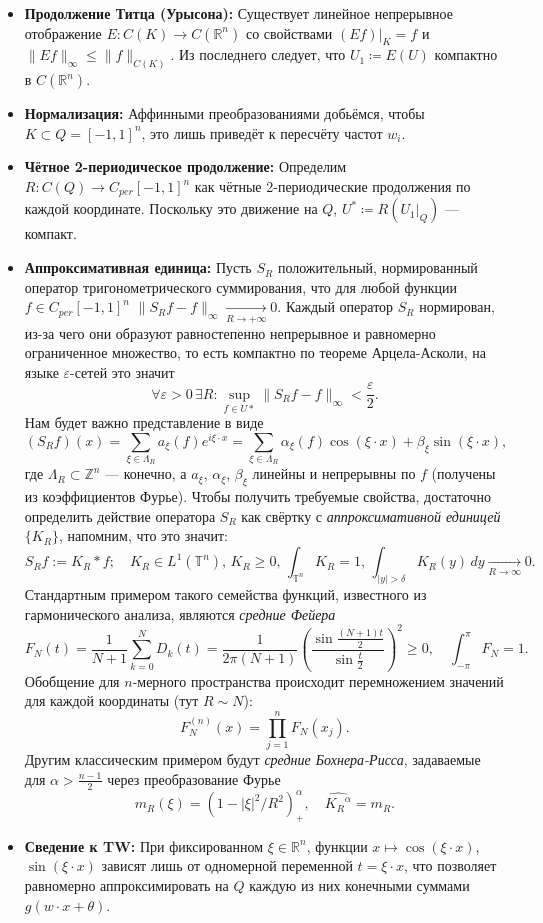 \documentclass[a4paper, 12pt]{article}
\theoremstyle{definition}
\theoremstyle{plain}
\theoremstyle{remark}
\theoremstyle{remark}
\theoremstyle{remark}
\begin{document}
\begin{itemize}
  \item \textbf{Продолжение Титца (Урысона):} Существует линейное непрерывное отображение $E\colon C(K) \to C(\mathbb{R}^n)$ со свойствами $(Ef)\big|_K = f$ и $\|Ef\|_\infty \le \|f\|_{C(K)}$.
  Из последнего следует, что $U_1 \coloneq E(U)$ компактно в $C(\mathbb{R}^n)$.
  \item \textbf{Нормализация:} Аффинными преобразованиями добьёмся, чтобы $K \subset Q = [-1, 1]^n$, это лишь приведёт к пересчёту частот $w_i$.
  \item \textbf{Чётное 2-периодическое продолжение:} Определим $R\colon C(Q) \to C_{per}[-1, 1]^n$ как чётные 2-периодические продолжения по каждой координате.
  Поскольку это движение на $Q$, $U^* \coloneq R(U_1\big|_Q)$ --- компакт.
  \item \textbf{Аппроксимативная единица:} Пусть $S_R$ положительный, нормированный оператор тригонометрического суммирования, что для любой функции $f \in C_{per}[-1, 1]^n$ $\|S_Rf - f\|_\infty \xrightarrow[R \to +\infty]{} 0$.
  Каждый оператор $S_R$ нормирован, из-за чего они образуют равностепенно непрерывное и равномерно ограниченное множество, то есть компактно по теореме Арцела-Асколи, на языке $\varepsilon$-сетей это значит
  $$\forall \varepsilon > 0\,\exists R\colon \sup_{f \in U*}\|S_Rf - f\|_\infty < \frac{\varepsilon}{2}.$$
  Нам будет важно представление в виде
  $$(S_Rf)(x) = \sum_{\xi \in \Lambda_R}a_\xi(f)e^{i\xi \cdot x} = \sum_{\xi \in \Lambda_R}\alpha_\xi(f)\cos(\xi \cdot x) + \beta_\xi\sin(\xi \cdot x),$$
  где $\Lambda_R\subset\mathbb{Z}^n$ --- конечно, а $a_\xi$, $\alpha_\xi$, $\beta_\xi$ линейны и непрерывны по $f$ (получены из коэффициентов Фурье).
  Чтобы получить требуемые свойства, достаточно определить действие оператора $S_R$ как свёртку с \emph{аппроксимативной единицей} $\{K_R\}$, напомним, что это значит:
  $$S_Rf := K_R * f; \quad K_R \in L^1(\mathbb{T}^n), \, K_R \ge 0, \, \int_{\mathbb{T}^n} K_R = 1, \, \int_{|y|>\delta} K_R(y) \, dy \xrightarrow[R \to \infty]{} 0.$$
  Стандартным примером такого семейства функций, известного из гармонического анализа, являются \emph{средние Фейера}
  $$F_N(t) = \frac{1}{N+1} \sum_{k=0}^{N} D_k(t) = \frac{1}{2\pi(N+1)} \left(\frac{\sin \frac{(N+1)t}{2}}{\sin \frac{t}{2}}\right)^2 \ge 0, \quad \int_{-\pi}^{\pi} F_N = 1.$$
  Обобщение для $n$-мерного пространства происходит перемножением значений для каждой координаты (тут $R \sim N$):
  $$F_N^{(n)}(x) = \prod_{j=1}^n F_N(x_j).$$
  Другим классическим примером будут \emph{средние Бохнера-Рисса}, задаваемые для $\alpha > \frac{n-1}{2}$ через преобразование Фурье
  $$m_R(\xi) = (1 - |\xi|^2 / R^2)_{+}^{\alpha}, \quad \widehat{{K_R}^\alpha} = m_R.$$
  \item \textbf{Сведение к TW:} При фиксированном $\xi \in \mathbb{R}^n$, функции $x \mapsto \cos(\xi \cdot x)$, $\sin({\xi \cdot x})$ зависят лишь от одномерной переменной $t = \xi \cdot x$, что позволяет равномерно аппроксимировать на $Q$ каждую из них конечными суммами $g(w \cdot x + \theta)$.
\end{itemize}
\end{document}
